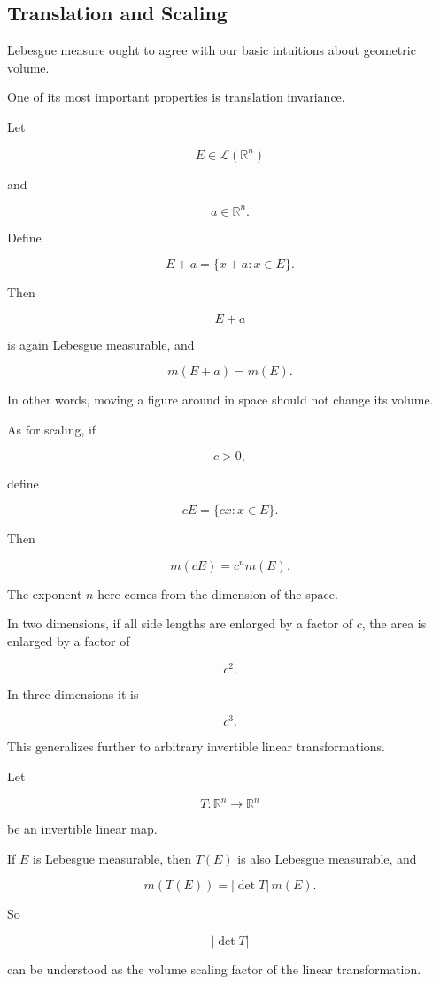 \documentclass[11pt]{article}
\begin{document}
\subsection{Translation and Scaling}

Lebesgue measure ought to agree with our basic intuitions about geometric volume.

One of its most important properties is translation invariance.

Let

\[
E\in\mathcal{L}(\mathbb{R}^{n})
\]

and

\[
a\in\mathbb{R}^{n}.
\]

Define

\[
E+a=\{x+a:x\in E\}.
\]

Then

\[
E+a
\]

is again Lebesgue measurable, and

\[
m(E+a)=m(E).
\]

In other words, moving a figure around in space should not change its volume.

As for scaling, if

\[
c>0,
\]

define

\[
cE=\{cx:x\in E\}.
\]

Then

\[
m(cE)=c^{n}m(E).
\]

The exponent $n$ here comes from the dimension of the space.

In two dimensions, if all side lengths are enlarged by a factor of $c$, the area is enlarged by a factor of

\[
c^{2}.
\]

In three dimensions it is

\[
c^{3}.
\]

This generalizes further to arbitrary invertible linear transformations.

Let

\[
T:\mathbb{R}^{n}\rightarrow\mathbb{R}^{n}
\]

be an invertible linear map.

If $E$ is Lebesgue measurable, then $T(E)$ is also Lebesgue measurable, and

\[
m(T(E))=|\det T|\,m(E).
\]

So

\[
|\det T|
\]

can be understood as the volume scaling factor of the linear transformation.
\end{document}
